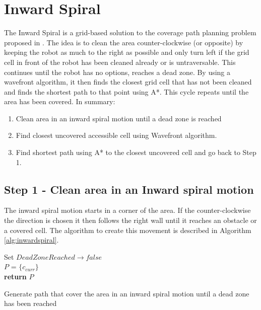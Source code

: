 \section{Inward Spiral}
 \label{sec:spiral}
The Inward Spiral is a grid-based solution to the coverage path planning problem proposed in \cite{inwardsspiral}. The idea is to clean the area counter-clockwise (or opposite) by keeping the robot as much to the right as possible and only turn left if the grid cell in front of the robot has been cleaned already or is untraversable. This continues until the robot has no options, reaches a dead zone. By using a wavefront algorithm, it then finds the closest grid cell that has not been cleaned and finds the shortest path to that point using A*. This cycle repeats until the area has been covered. In summary:

\begin{enumerate}
    \item Clean area in an inward spiral motion until a dead zone is reached
    \item Find closest uncovered accessible cell using Wavefront algorithm.
    \item Find shortest path using A* to the closest uncovered cell and go back to Step 1.
\end{enumerate}

\subsection{Step 1 - Clean area in an Inward spiral motion}

The inward spiral motion starts in a corner of the area. If the counter-clockwise the direction is chosen it then follows the right wall until it reaches an obstacle or a covered cell. The algorithm to create this movement is described in Algorithm \ref{alg:inwardspiral}.

\begin{algorithm}[H]
\SetAlgoLined
{}
\textup{Set $DeadZoneReached \rightarrow false$} \\
$P$ = $\{c_{curr}\}$ \\
\textup{\textbf{return}} $P$

 \caption{Generate path that cover the area in an inward spiral motion until a dead zone has been reached}
 \label{alg:inwardspiral}
\end{algorithm}

